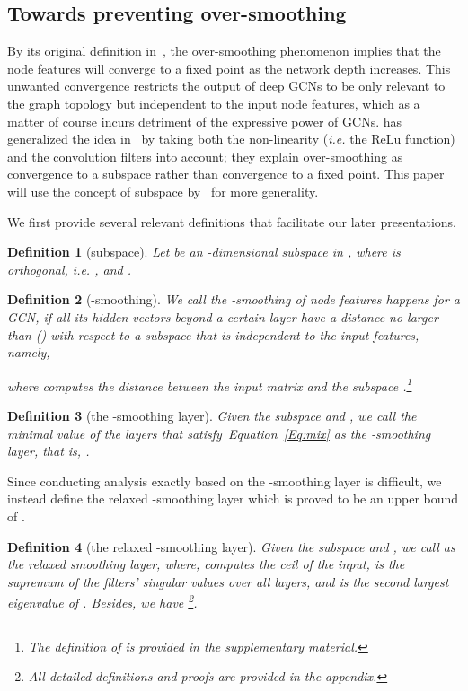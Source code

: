 \documentclass{article}
\newtheorem{definition}{Definition}
\def\Eqref#1{Equation~\ref{#1}}
\begin{document}
\subsection{Towards preventing over-smoothing}
\label{sec:over-smoothing}
By its original definition in~\citet{Li2018}, the over-smoothing phenomenon implies that the node features will converge to a fixed point as the network depth increases. This unwanted convergence restricts the output of deep GCNs to be only relevant to the graph topology but independent to the input node features, which as a matter of course incurs detriment of the expressive power of GCNs. \citet{oono2019asymptotic} has generalized the idea in~\citet{Li2018} by taking both the non-linearity (\emph{i.e.} the ReLu function) and the convolution filters into account; they explain over-smoothing as convergence to a subspace rather than convergence to a fixed point. This paper will use the concept of subspace by~\citet{oono2019asymptotic} for more generality.

We first provide several relevant definitions that facilitate our later presentations.
\begin{definition}[subspace]
Let  be an -dimensional subspace in , where  is orthogonal, \emph{i.e.} , and .
\end{definition}
\begin{definition}[-smoothing]
We call the -smoothing of node features happens for a GCN, if all its hidden vectors  beyond a certain layer  have a distance no larger than  () with respect to a subspace  that is independent to the input features, namely,

where  computes the distance between the input matrix and the subspace .\footnote{The definition of  is provided in the supplementary material.}
\end{definition}
\begin{definition}[the -smoothing layer]
Given the subspace  and , we call the minimal value of the layers that satisfy~\Eqref{Eq:mix} as the -smoothing layer, that is, .
\end{definition}

Since conducting analysis exactly based on the -smoothing layer is difficult, we instead define the relaxed -smoothing layer which is proved to be an upper bound of .
\begin{definition}[the relaxed -smoothing layer] 
Given the subspace  and , we call  as the relaxed smoothing layer, where,  computes the ceil of the input,  is the supremum of the filters' singular values over all layers, and  is the second largest eigenvalue of . Besides, we have \footnote{ All detailed definitions and proofs are provided in the appendix.}.
\end{definition}
\end{document}

